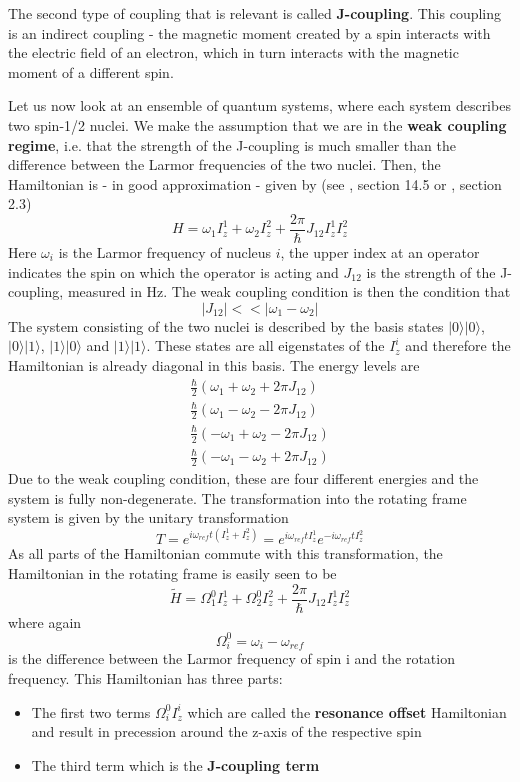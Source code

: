 \documentclass[a4paper, draft]{article}
\theoremstyle{own}
\theoremstyle{remark}
\begin{document}
The second type of coupling that is relevant is called {\bf J-coupling}. This coupling is an indirect coupling - the magnetic moment created by a spin interacts with the electric field of an electron, which in turn interacts with the magnetic moment of a different spin. 

Let us now look at an ensemble of quantum systems, where each system describes two spin-1/2 nuclei. We make the assumption that we are in the {\bf weak coupling regime}, i.e. that the strength of the J-coupling is much smaller than the difference between the Larmor frequencies of the two nuclei. Then, the Hamiltonian is - in good approximation - given by (see \cite{Levitt}, section 14.5 or \cite{NMRReview}, section 2.3)
$$
H  =  \omega_1 I^1_z + \omega_2 I^2_z + \frac{2 \pi}{\hbar} J_{12} I^1_z I^2_z
$$
Here $\omega_i$ is the Larmor frequency of nucleus $i$, the upper index at an operator indicates the spin on which the operator is acting and $J_{12}$ is the strength of the J-coupling, measured in Hz. The weak coupling condition is then the condition that
$$
|J_{12} | << |\omega_1 - \omega_2 |
$$
The system consisting of the two nuclei is described by the basis states $|0 \rangle |0 \rangle$, $|0 \rangle | 1 \rangle$, $|1 \rangle |0 \rangle$ and $|1 \rangle |1 \rangle$. These states are all eigenstates of the $I_z^i$ and therefore the Hamiltonian is already diagonal in this basis. The energy levels are
\begin{align*}
\frac{\hbar}{2} (\omega_1 + \omega_2 + 2\pi J_{12}) \\
\frac{\hbar}{2} (\omega_1 -\omega_2 - 2\pi J_{12}) \\
\frac{\hbar}{2} (-\omega_1 +\omega_2 - 2\pi J_{12}) \\
\frac{\hbar}{2} (-\omega_1 - \omega_2 + 2\pi J_{12}) 
\end{align*}
Due to the weak coupling condition, these are four different energies and the system is fully non-degenerate. The transformation into the rotating frame system is given by the unitary transformation
$$
T = e^{i \omega_{ref}t (I^1_z + I^2_z)} =  e^{i \omega_{ref}t I^1_z} e^{-i\omega_{ref}t I^2_z}
$$
As all parts of the Hamiltonian commute with this transformation, the Hamiltonian in the rotating frame is easily seen to be
$$
\widetilde{H} =  \Omega^0_1 I^1_z + \Omega^0_2 I_z^2 + \frac{2 \pi}{\hbar} J_{12} I_z^1 I_z^2
$$
where again
$$
\Omega^0_i = \omega_i - \omega_{ref}
$$
is the difference between the Larmor frequency of spin i and the rotation frequency. This Hamiltonian has three parts:
\begin{itemize}
	\item The first two terms $\Omega^0_i I^i_z$ which are called the {\bf resonance offset} Hamiltonian and result in precession around the z-axis of the respective spin
	\item The third term which is the {\bf J-coupling term}
\end{itemize}
\end{document}

